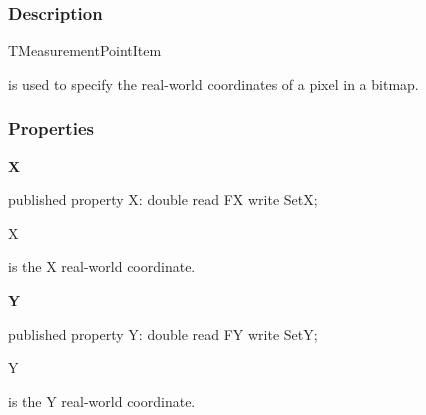 \documentclass{report}
\newif\ifpdf
\begin{document}
\subsubsection*{\large{\textbf{Description}}\normalsize\hspace{1ex}\hfill}
\begin{ttfamily}TMeasurementPointItem\end{ttfamily} is used to specify the real{-}world coordinates of a pixel in a bitmap.\subsubsection*{\large{\textbf{Properties}}\normalsize\hspace{1ex}\hfill}
\begin{list}{}{
\setlength{\itemindent}{0cm}
\setlength{\listparindent}{0cm}
\setlength{\leftmargin}{\evensidemargin}
\addtolength{\leftmargin}{\tmplength}
\settowidth{\labelsep}{X}
\addtolength{\leftmargin}{\labelsep}
\setlength{\labelwidth}{\tmplength}
}
\label{ok_link_1_char.TMeasurementPointItem-X}
\item[\textbf{X}\hfill]
\ifpdf
\begin{flushleft}
\fi
\begin{ttfamily}
published property X: double read FX write SetX;\end{ttfamily}

\ifpdf
\end{flushleft}
\fi


\par \begin{ttfamily}X\end{ttfamily} is the X real{-}world coordinate.\label{ok_link_1_char.TMeasurementPointItem-Y}
\item[\textbf{Y}\hfill]
\ifpdf
\begin{flushleft}
\fi
\begin{ttfamily}
published property Y: double read FY write SetY;\end{ttfamily}

\ifpdf
\end{flushleft}
\fi


\par \begin{ttfamily}Y\end{ttfamily} is the Y real{-}world coordinate.\end{list}
\end{document}
